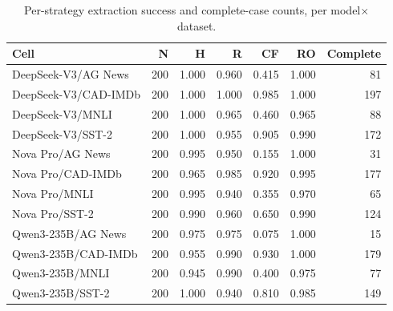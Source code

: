 \begin{table}[t]
\centering
\small
\caption{Per-strategy extraction success and complete-case counts, per model$\times$dataset.}
\label{tab:coverage}
\begin{tabular}{lrrrrrr}
\toprule
Cell & N & H & R & CF & RO & Complete \\
\midrule
DeepSeek-V3/AG News & 200 & 1.000 & 0.960 & 0.415 & 1.000 & 81 \\
DeepSeek-V3/CAD-IMDb & 200 & 1.000 & 1.000 & 0.985 & 1.000 & 197 \\
DeepSeek-V3/MNLI & 200 & 1.000 & 0.965 & 0.460 & 0.965 & 88 \\
DeepSeek-V3/SST-2 & 200 & 1.000 & 0.955 & 0.905 & 0.990 & 172 \\
Nova Pro/AG News & 200 & 0.995 & 0.950 & 0.155 & 1.000 & 31 \\
Nova Pro/CAD-IMDb & 200 & 0.965 & 0.985 & 0.920 & 0.995 & 177 \\
Nova Pro/MNLI & 200 & 0.995 & 0.940 & 0.355 & 0.970 & 65 \\
Nova Pro/SST-2 & 200 & 0.990 & 0.960 & 0.650 & 0.990 & 124 \\
Qwen3-235B/AG News & 200 & 0.975 & 0.975 & 0.075 & 1.000 & 15 \\
Qwen3-235B/CAD-IMDb & 200 & 0.955 & 0.990 & 0.930 & 1.000 & 179 \\
Qwen3-235B/MNLI & 200 & 0.945 & 0.990 & 0.400 & 0.975 & 77 \\
Qwen3-235B/SST-2 & 200 & 1.000 & 0.940 & 0.810 & 0.985 & 149 \\
\bottomrule
\end{tabular}
\end{table}

